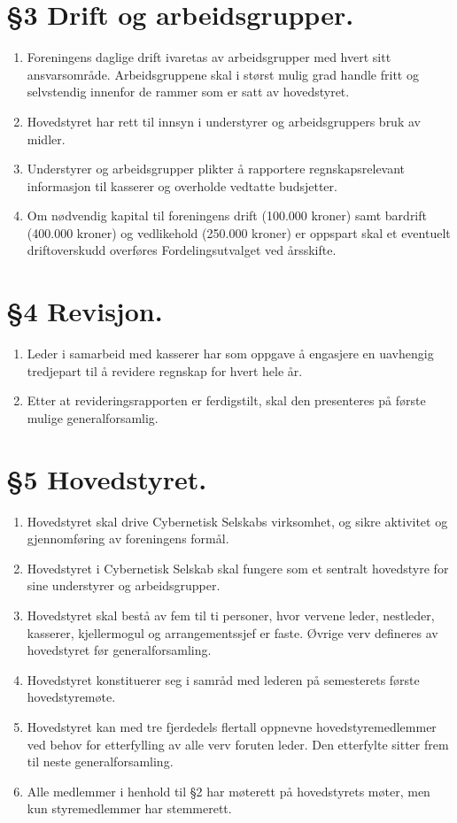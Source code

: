 \documentclass[10pt,norsk,a4paper]{article}
\begin{document}
\section*{§3 Drift og arbeidsgrupper.}
\begin{enumerate}
	\item{Foreningens daglige drift ivaretas av arbeidsgrupper med hvert sitt ansvarsområde. Arbeidsgruppene skal i størst mulig grad handle fritt og selvstendig innenfor de rammer som er satt av hovedstyret.}
	\item{Hovedstyret har rett til innsyn i understyrer og arbeidsgruppers bruk av midler.}
	\item{Understyrer og arbeidsgrupper plikter å rapportere regnskapsrelevant informasjon til kasserer og overholde vedtatte budsjetter.}
	\item{Om nødvendig kapital til foreningens drift (100.000 kroner) samt bardrift (400.000 kroner) og vedlikehold (250.000 kroner) er oppspart skal et eventuelt driftoverskudd overføres Fordelingsutvalget ved årsskifte.}
\end{enumerate}

\section*{§4 Revisjon.}
\begin{enumerate}
	\item{Leder i samarbeid med kasserer har som oppgave å engasjere en uavhengig tredjepart til å revidere regnskap for hvert hele år.}
	\item{Etter at revideringsrapporten er ferdigstilt, skal den presenteres på første mulige generalforsamlig.}
\end{enumerate}

\section*{§5 Hovedstyret.}
\begin{enumerate}
	\item{Hovedstyret skal drive Cybernetisk Selskabs virksomhet, og sikre aktivitet og gjennomføring av foreningens formål.}
	\item{Hovedstyret i Cybernetisk Selskab skal fungere som et sentralt hovedstyre for sine understyrer og arbeidsgrupper.}
	\item{Hovedstyret skal bestå av fem til ti personer, hvor vervene leder, nestleder, kasserer, kjellermogul og arrangementssjef er faste. Øvrige verv defineres av hovedstyret før generalforsamling.}
	\item{Hovedstyret konstituerer seg i samråd med lederen på semesterets første hovedstyremøte.}
        \item{Hovedstyret kan med tre fjerdedels flertall oppnevne hovedstyremedlemmer ved behov for etterfylling av alle verv foruten leder. Den etterfylte sitter frem til neste generalforsamling. }
	\item{Alle medlemmer i henhold til §2 har møterett på hovedstyrets møter, men kun styremedlemmer har stemmerett.}
\end{enumerate}
\end{document}

